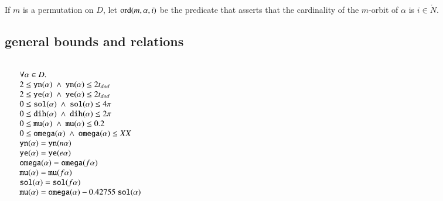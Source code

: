 If $m$ is  a permutation on $D$, let ${\operatorname{ord}}(m,\alpha,i)$
be the predicate that asserts that the cardinality of the $m$-orbit
of $\alpha$ is $i\in\ring{N}$.
\bigskip

\def\sland{\ \land\ }

\subsection{general bounds and relations}

$$
\begin{array}{lll}
\leftalign\\
   \forall \alpha\in D.\\
    2 \le \optt{yn}(\alpha) \sland
    \optt{yn}(\alpha) \le 2t_{dod} \\
    2 \le \optt{ye}(\alpha) \sland
    \optt{ye}(\alpha) \le 2t_{dod}\\
   0 \le \optt{sol}(\alpha) \sland
     \optt{sol}(\alpha) \le 4 \pi \\
   0 \le \optt{dih}(\alpha) \sland
     \optt{dih}(\alpha) \le 2\pi \\
   0 \le \optt{mu}(\alpha) \sland
      \optt{mu}(\alpha) \le 0.2 \\
   0 \le \optt{omega}(\alpha) \sland
      \optt{omega}(\alpha) \le XX \\
  \optt{yn}(\alpha) = \optt{yn}(n\alpha) \\
  \optt{ye}(\alpha) = \optt{ye}(e\alpha) \\
  \optt{omega}(\alpha) = \optt{omega}(f\alpha) \\
  \optt{mu}(\alpha) = \optt{mu}(f\alpha) \\
  \optt{sol}(\alpha)= \optt{sol}(f\alpha) \\
  \optt{mu}(\alpha) = \optt{omega}(\alpha) - 0.42755\ \optt{sol}(\alpha) \\

\end{array}
$$



